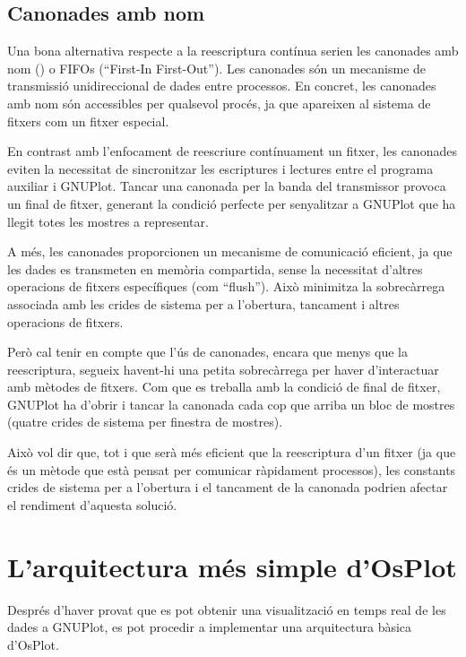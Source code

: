 \documentclass{tfgitic}[2023/06/30]
\begin{document}
\subsection{Canonades amb nom}

Una bona alternativa respecte a la reescriptura contínua serien les
canonades amb nom (\cite[``Named Pipes'']{canonades-nom}) o FIFOs
(``First-In First-Out''). Les canonades són un mecanisme de
transmissió unidireccional de dades entre processos. En concret, les
canonades amb nom són accessibles per qualsevol procés, ja que
apareixen al sistema de fitxers com un fitxer especial.

En contrast amb l'enfocament de reescriure contínuament un fitxer, les
canonades eviten la necessitat de sincronitzar les escriptures i
lectures entre el programa auxiliar i GNUPlot. Tancar una canonada per
la banda del transmissor provoca un final de fitxer, generant la
condició perfecte per senyalitzar a GNUPlot que ha llegit totes les
mostres a representar.

A més, les canonades proporcionen un mecanisme de comunicació
eficient, ja que les dades es transmeten en memòria compartida, sense
la necessitat d'altres operacions de fitxers específiques (com
``flush''). Això minimitza la sobrecàrrega associada amb les crides de
sistema per a l'obertura, tancament i altres operacions de fitxers.

Però cal tenir en compte que l'ús de canonades, encara que menys que
la reescriptura, segueix havent-hi una petita sobrecàrrega per haver
d'interactuar amb mètodes de fitxers. Com que es treballa amb la
condició de final de fitxer, GNUPlot ha d'obrir i tancar la canonada
cada cop que arriba un bloc de mostres (quatre crides de sistema per
finestra de mostres).

Això vol dir que, tot i que serà més eficient que la reescriptura d'un
fitxer (ja que és un mètode que està pensat per comunicar ràpidament
processos), les constants crides de sistema per a l'obertura i el
tancament de la canonada podrien afectar el rendiment d'aquesta
solució.

\section{L'arquitectura més simple d'OsPlot}

Després d'haver provat que es pot obtenir una visualització en temps
real de les dades a GNUPlot, es pot procedir a implementar una
arquitectura bàsica d'OsPlot.
\end{document}
